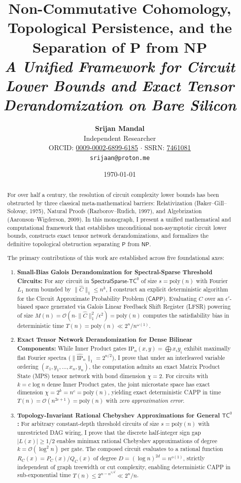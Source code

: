\documentclass[11pt,a4paper]{article}
\title{
    \vspace{-1.5in}
    {\LARGE\bfseries\color{primary} Non-Commutative Cohomology, Topological Persistence, and the Separation of $\mathbf{P}$ from $\mathbf{NP}$}\\[0.3em]
    {\large\itshape A Unified Framework for Circuit Lower Bounds and Exact Tensor Derandomization on Bare Silicon}
}
\author{
    \textbf{Srijan Mandal}\\
    \small Independent Researcher\\
    \small ORCID: \href{https://orcid.org/0009-0002-6899-6185}{0009-0002-6899-6185} $\cdot$ SSRN: \href{https://papers.ssrn.com/sol3/papers.cfm?abstract_id=7461081}{7461081}\\
    \small \texttt{srijaan@proton.me}
}
\date{\today}
\theoremstyle{definition}
\theoremstyle{remark}
\newcommand{\NP}{\mathsf{NP}}
\newcommand{\PP}{\mathsf{P}}
\newcommand{\TC}{\mathsf{TC}}
\newcommand{\poly}{\mathrm{poly}}
\newcommand{\CAPP}{\mathsf{CAPP}}
\newcommand{\SparseTC}{\mathsf{SpectralSparse}\text{-}\mathsf{TC}^0}
\newcommand{\IP}{\mathrm{IP}}
\begin{document}
\maketitle

\begin{abstract}
For over half a century, the resolution of circuit complexity lower bounds has been obstructed by three classical meta-mathematical barriers: Relativization (Baker--Gill--Solovay, 1975), Natural Proofs (Razborov--Rudich, 1997), and Algebrization (Aaronson--Wigderson, 2009). In this monograph, I present a unified mathematical and computational framework that establishes unconditional non-asymptotic circuit lower bounds, constructs exact tensor network derandomizations, and formalizes the definitive topological obstruction separating $\PP$ from $\NP$.

The primary contributions of this work are established across five foundational axes:
\begin{enumerate}
    \item \textbf{Small-Bias Galois Derandomization for Spectral-Sparse Threshold Circuits:} For any circuit in $\SparseTC$ of size $s = \poly(n)$ with Fourier $L_1$ norm bounded by $\|\hat{C}\|_1 \le n^k$, I construct an explicit deterministic algorithm for the Circuit Approximate Probability Problem ($\CAPP$). Evaluating $C$ over an $\epsilon'$-biased space generated via Galois Linear Feedback Shift Register (LFSR) powering of size $M(n) = \mathcal{O}(n \cdot \|\hat{C}\|_1^2 / \epsilon^2) = \poly(n)$ computes the satisfiability bias in deterministic time $T(n) = \poly(n) \ll 2^n / n^{\omega(1)}$.
    
    \item \textbf{Exact Tensor Network Derandomization for Dense Bilinear Components:} While Inner Product gates $\IP_n(x, y) = \bigoplus x_i y_i$ exhibit maximally flat Fourier spectra ($\|\widehat{\IP}_n\|_1 = 2^{n/2}$), I prove that under an interleaved variable ordering $(x_1, y_1, \dots, x_n, y_n)$, the computation admits an exact Matrix Product State (MPS) tensor network with bond dimension $\chi = 2$. For circuits with $k = c \log n$ dense Inner Product gates, the joint microstate space has exact dimension $\chi = 2^k = n^c = \poly(n)$, yielding exact deterministic CAPP in time $T(n) = \mathcal{O}(n^{2c+1}) = \poly(n)$ with \emph{zero approximation error}.
    
    \item \textbf{Topology-Invariant Rational Chebyshev Approximations for General $\TC^0$:} For arbitrary constant-depth threshold circuits of size $s = \poly(n)$ with unrestricted DAG wiring, I prove that the discrete half-integer sign gap $|L(x)| \ge 1/2$ enables minimax rational Chebyshev approximations of degree $k = \mathcal{O}(\log^2 n)$ per gate. The composed circuit evaluates to a rational function $R_C(x) = P_C(x) / Q_C(x)$ of degree $D = (\log n)^{2d} = n^{o(1)}$, strictly independent of graph treewidth or cut complexity, enabling deterministic CAPP in sub-exponential time $T(n) \le 2^{n - n^{1/d}} \ll 2^n / n$.
    

\end{enumerate}
\end{abstract}
\end{document}
